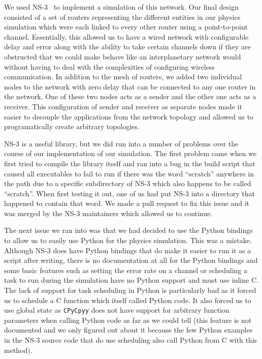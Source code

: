 \documentclass[a4paper,12pt]{article}
\newcommand{\CC}{C\nolinebreak\hspace{-.05em}\raisebox{.4ex}{\tiny\bf +}\nolinebreak\hspace{-.10em}\raisebox{.4ex}{\tiny\bf +}}
\def\CC{{C\nolinebreak[4]\hspace{-.05em}\raisebox{.4ex}{\tiny\bf ++}}}
\begin{document}
We used NS-3~\cite{ns-3} to implement a simulation of this network. Our final
design consisted of a set of routers representing the different entities in our
physics simulation which were each linked to every other router using a
point-to-point channel. Essentially, this allowed us to have a wired network
with configurable delay and error along with the ability to take certain
channels down if they are obstructed that we could make behave like an
interplanetary network would without having to deal with the complexities of
configuring wireless communication. In addition to the mesh of routers, we added
two individual nodes to the network with zero delay that can be connected to any
one router in the network. One of these two nodes acts as a sender and the other
one acts as a receiver. This configuration of sender and receiver as separate
nodes made it easier to decouple the applications from the network topology and
allowed us to programatically create arbitrary topologies.

NS-3 is a useful library, but we did run into a number of problems over the
course of our implementation of our simulation. The first problem came when we
first tried to compile the library itself and ran into a bug in the build script
that caused all executables to fail to run if there was the word ``scratch''
anywhere in the path due to a specific subdirectory of NS-3 which also happens
to be called ``scratch''. When first testing it out, one of us had put NS-3 into
a directory that happened to contain that word. We made a pull request to fix
this issue and it was merged by the NS-3 maintainers which allowed us to
continue.

The next issue we ran into was that we had decided to use the Python bindings to
allow us to easily use Python for the physics simulation. This was a mistake.
Although NS-3 does have Python bindings that do make it easier to run it as a
script after writing, there is no documentation at all for the Python bindings
and some basic features such as setting the error rate on a channel or
scheduling a task to run during the simulation have no Python support and must
use inline \CC. The lack of support for task scheduling in Python is
particularly bad as it forced us to schedule a \CC{} function which itself
called Python code. It also forced us to use global state as \texttt{CPyCpyy}
does not have support for arbitrary function parameters when calling Python code
as far as we could tell (this feature is not documented and we only figured out
about it because the few Python examples in the NS-3 source code that do use
scheduling also call Python from \CC{} with this method).
\end{document}
